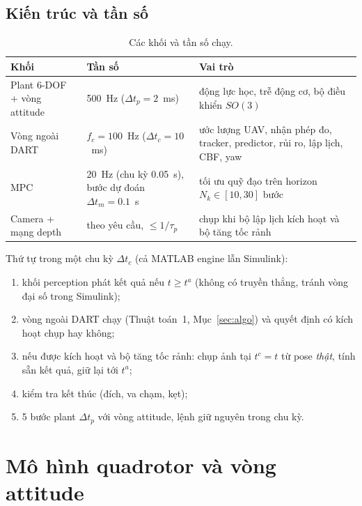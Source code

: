 \documentclass[11pt,a4paper]{article}
\numberwithin{equation}{section}
\theoremstyle{definition}
\theoremstyle{plain}
\theoremstyle{remark}
\begin{document}
\subsection{Kiến trúc và tần số}
\begin{table}[h]
\centering\small
\caption{Các khối và tần số chạy.}\label{tab:rates}
\begin{tabular}{@{}p{4.3cm}p{2.6cm}p{7.6cm}@{}}
\toprule
Khối & Tần số & Vai trò \\ \midrule
Plant 6-DOF + vòng attitude & 500~Hz ($\Delta t_p=2$~ms) & động lực học, trễ động cơ, bộ điều khiển $SO(3)$ \\
Vòng ngoài DART & $f_c=100$~Hz ($\Delta t_c=10$~ms) & ước lượng UAV, nhận phép đo, tracker, predictor, rủi ro, lập lịch, CBF, yaw \\
MPC & 20~Hz (chu kỳ 0.05~s), bước dự đoán $\Delta t_m=0.1$~s & tối ưu quỹ đạo trên horizon $N_k\in[10,30]$ bước \\
Camera + mạng depth & theo yêu cầu, $\le1/\tau_p$ & chụp khi bộ lập lịch kích hoạt và bộ tăng tốc rảnh \\
\bottomrule
\end{tabular}
\end{table}

Thứ tự trong một chu kỳ $\Delta t_c$ (cả MATLAB engine lẫn Simulink):
\begin{enumerate}[nosep]
\item khối perception phát kết quả nếu $t\ge t^a$ (không có truyền thẳng, tránh vòng đại số trong Simulink);
\item vòng ngoài DART chạy (Thuật toán~1, Mục~\ref{sec:algo}) và quyết định có kích hoạt chụp hay không;
\item nếu được kích hoạt và bộ tăng tốc rảnh: chụp ảnh tại $t^c=t$ từ pose \emph{thật}, tính sẵn kết quả, giữ lại tới $t^a$;
\item kiểm tra kết thúc (đích, va chạm, kẹt);
\item 5 bước plant $\Delta t_p$ với vòng attitude, lệnh giữ nguyên trong chu kỳ.
\end{enumerate}

\section{Mô hình quadrotor và vòng attitude}
\label{sec:model}
\end{document}
